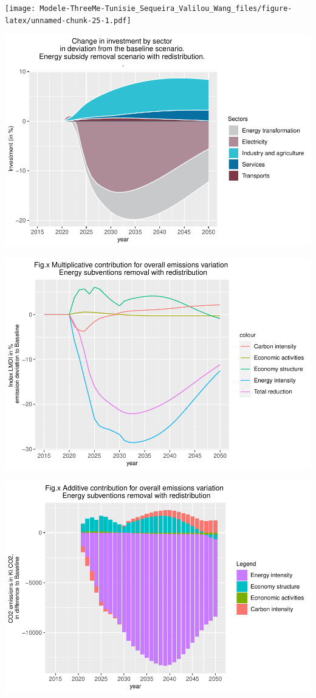 \documentclass[
]{article}
\begin{document}
\texttt{[image: Modele-ThreeMe-Tunisie\_Sequeira\_Valilou\_Wang\_files/figure-latex/unnamed-chunk-25-1.pdf]}

\includegraphics{Modele-ThreeMe-Tunisie_Sequeira_Valilou_Wang_files/figure-latex/unnamed-chunk-26-1.pdf}

\includegraphics{Modele-ThreeMe-Tunisie_Sequeira_Valilou_Wang_files/figure-latex/unnamed-chunk-27-1.pdf}

\includegraphics{Modele-ThreeMe-Tunisie_Sequeira_Valilou_Wang_files/figure-latex/unnamed-chunk-28-1.pdf}
\end{document}
